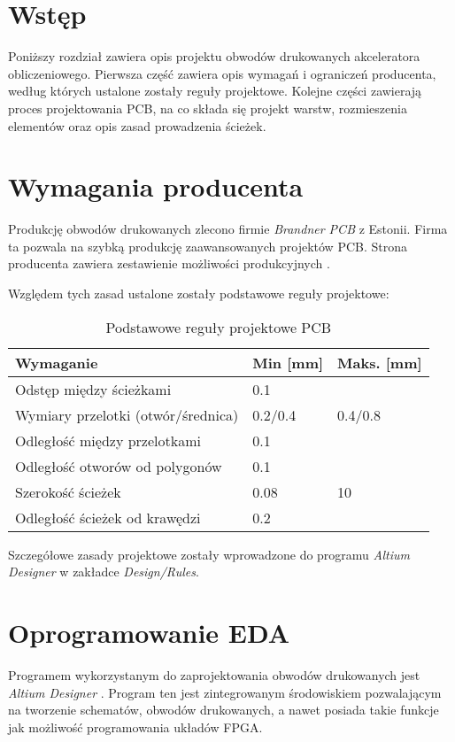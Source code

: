 \section{Wstęp}
Poniższy rozdział zawiera opis projektu obwodów drukowanych akceleratora obliczeniowego. Pierwsza część zawiera opis wymagań i ograniczeń producenta, według których ustalone zostały reguły projektowe. Kolejne części zawierają proces projektowania PCB, na co składa się projekt warstw, rozmieszenia elementów oraz opis zasad prowadzenia ścieżek.

\section{Wymagania producenta}
Produkcję obwodów drukowanych zlecono firmie \textit{Brandner PCB} \cite{BRANDNER} z Estonii. Firma ta pozwala na szybką produkcję zaawansowanych projektów PCB. Strona producenta zawiera zestawienie możliwości produkcyjnych \cite{BRANDNER_PRODUCTION}. 


Względem tych zasad ustalone zostały podstawowe reguły projektowe:

\begin{table}[h]
\centering
	\caption{Podstawowe reguły projektowe PCB}
    \begin{tabular}{p{7cm} | p{2cm} |  p{2.5cm}}
	\toprule
    \textbf{Wymaganie} & \textbf{Min [mm]} & \textbf{Maks. [mm]}\\
    \midrule
    Odstęp między ścieżkami 		& 	0.1		&			\\
    Wymiary przelotki (otwór/średnica)	& 	0.2/0.4	&	0.4/0.8	\\
    Odległość między przelotkami 		& 	0.1		&			\\
    Odległość otworów od polygonów 	& 	0.1		&			\\
    Szerokość ścieżek			&	0.08		&	10		\\
    Odległość ścieżek od krawędzi		&	0.2		&			\\
	\toprule
    \end{tabular}

	\label{tbl:pcb_design_rules}
\end{table}

Szczegółowe zasady projektowe zostały wprowadzone do programu \textit{Altium Designer} w zakładce \textit{Design/Rules}.

\section{Oprogramowanie EDA}
Programem wykorzystanym do zaprojektowania obwodów drukowanych jest \textit{Altium Designer} \cite{ALTIUM}. Program ten jest zintegrowanym środowiskiem pozwalającym na tworzenie schematów, obwodów drukowanych, a nawet posiada takie funkcje jak możliwość programowania układów FPGA.  
